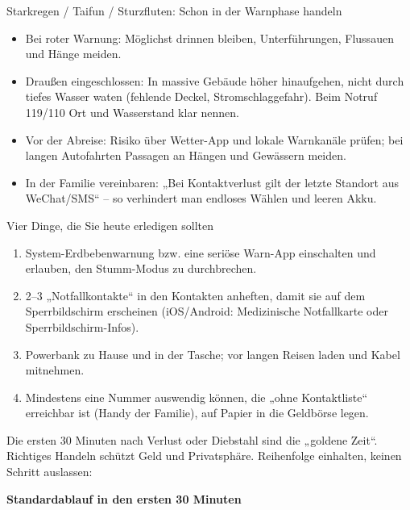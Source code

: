 \begin{tcbwarn}{Starkregen / Taifun / Sturzfluten: Schon in der Warnphase handeln}
\begin{itemize}
  \item Bei roter Warnung: Möglichst drinnen bleiben, Unterführungen, Flussauen und Hänge meiden.
  \item Draußen eingeschlossen: In massive Gebäude höher hinaufgehen, nicht durch tiefes Wasser waten (fehlende Deckel, Stromschlaggefahr). Beim Notruf 119/110 Ort und Wasserstand klar nennen.
  \item Vor der Abreise: Risiko über Wetter-App und lokale Warnkanäle prüfen; bei langen Autofahrten Passagen an Hängen und Gewässern meiden.
  \item In der Familie vereinbaren: „Bei Kontaktverlust gilt der letzte Standort aus WeChat/SMS“ – so verhindert man endloses Wählen und leeren Akku.
\end{itemize}

\end{tcbwarn}

\begin{tcbpractice}{Vier Dinge, die Sie heute erledigen sollten}
\begin{enumerate}
  \item System-Erdbebenwarnung bzw. eine seriöse Warn-App einschalten und erlauben, den Stumm-Modus zu durchbrechen.
  \item 2–3 „Notfallkontakte“ in den Kontakten anheften, damit sie auf dem Sperrbildschirm erscheinen (iOS/Android: Medizinische Notfallkarte oder Sperrbildschirm-Infos).
  \item Powerbank zu Hause und in der Tasche; vor langen Reisen laden und Kabel mitnehmen.
  \item Mindestens eine Nummer auswendig können, die „ohne Kontaktliste“ erreichbar ist (Handy der Familie), auf Papier in die Geldbörse legen.
\end{enumerate}

\end{tcbpractice}


Die ersten 30 Minuten nach Verlust oder Diebstahl sind die „goldene Zeit“. Richtiges Handeln schützt Geld und Privatsphäre. Reihenfolge einhalten, keinen Schritt auslassen:

\textbf{Standardablauf in den ersten 30 Minuten}\par


